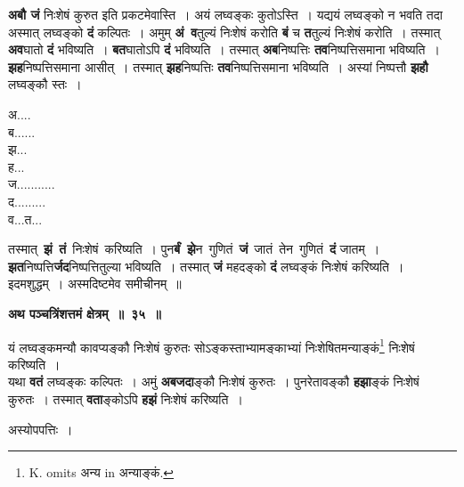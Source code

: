 \documentclass[11pt, openany]{book}
\begin{document}
\begin{flushleft}
\begin{minipage}[t]{0.75\textwidth}
\hspace{4mm} \textbf{अबौ जं} निःशेषं कुरुत इति प्रकटमेवास्ति~। अयं लघ्वङ्कः कुतोऽस्ति~। यद्ययं लघ्वङ्को न भवति तदा अस्मात् लघ्वङ्को \textbf{दं} कल्पितः~। अमुम् \;\textbf{अं \,व}तुल्यं \;निःशेषं \;करोति \;\textbf{बं} \;च \;\textbf{त}तुल्यं निःशेषं करोति~। तस्मात् \textbf{अव}घातो \textbf{दं} भविष्यति~। \textbf{बत}घातोऽपि \textbf{दं} भविष्यति~। तस्मात् \textbf{अब}निष्पत्तिः \textbf{तव}निष्पत्तिसमाना भविष्यति~। \textbf{झह}निष्पत्तिसमाना आसीत्~। तस्मात् \textbf{झह}निष्पत्तिः \textbf{तव}निष्पत्तिसमाना भविष्यति~। अस्यां निष्पत्तौ \textbf{झहौ} लघ्वङ्कौ स्तः~।
\end{minipage} 
\hfill
\begin{minipage}[t]{0.15\textwidth}
अ....\\
ब...... \\
झ...\\
ह...\\
ज...........\\
द.........\\
व...त...
\end{minipage}
\end{flushleft}
\vspace{-3mm}

\noindent तस्मात् \,\textbf{झं \,तं} \,निःशेषं \,करिष्यति~। पुन\textbf{र्बं \,झे}न \,गुणितं \,\textbf{जं} \,जातं \,तेन \,गुणितं \,\textbf{दं} जातम्~। \textbf{झत}निष्पत्ति\textbf{र्जद}निष्पत्तितुल्या भविष्यति~। तस्मात् \textbf{जं} महदङ्को \textbf{दं} लघ्वङ्कं निःशेषं करिष्यति~। इदमशुद्धम्~। अस्मदिष्टमेव समीचीनम्~॥ 
\vspace{2mm}

\begin{center}
\textbf{\large अथ पञ्चत्रिंशत्तमं क्षेत्रम्~॥~३५~॥}
\end{center}

{\ab यं लघ्वङ्कमन्यौ कावप्यङ्कौ निःशेषं कुरुतः सोऽङ्कस्ताभ्यामङ्काभ्यां निःशेषितमन्याङ्कं\renewcommand{\thefootnote}{१}\footnote{{\en K. omits} अन्य {\en in} अन्याङ्कं.} निःशेषं करिष्यति~। }\\

 यथा \textbf{वतं} लघ्वङ्कः कल्पितः~। अमुं \textbf{अबजदा}ङ्कौ निःशेषं कुरुतः~। पुनरेतावङ्कौ \textbf{हझा}ङ्कं निःशेषं कुरुतः~। तस्मात् \textbf{वता}ङ्कोऽपि \textbf{हझं} निःशेषं करिष्यति~। 
 
\newpage
 \begin{center}
अस्योपपत्तिः~।
\end{center}
\end{document}
